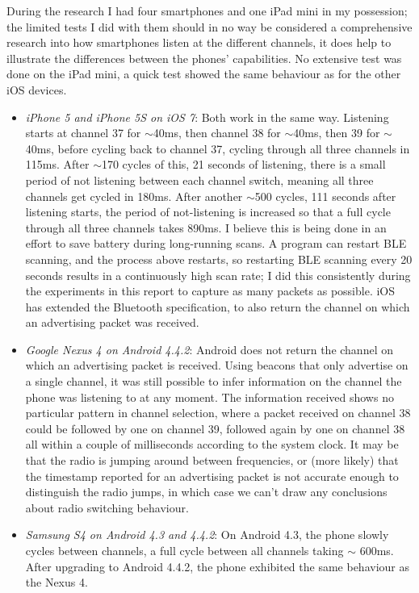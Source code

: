 During the research I had four smartphones and one iPad mini in my possession; the limited tests I did with them should in no way be considered a comprehensive research into how smartphones listen at the different channels, it does help to illustrate the differences between the phones' capabilities.
No extensive test was done on the iPad mini, a quick test showed the same behaviour as for the other iOS devices.
\begin{itemize}
    \item \emph{iPhone 5 and iPhone 5S on iOS 7}: Both work in the same way.
        Listening starts at channel 37 for $\sim$40ms, then channel 38 for $\sim$40ms, then 39 for $\sim$40ms, before cycling back to channel 37, cycling through all three channels in 115ms.
        After $\sim$170 cycles of this, 21 seconds of listening, there is a small period of not listening between each channel switch, meaning all three channels get cycled in 180ms.
        After another $\sim$500 cycles, 111 seconds after listening starts, the period of not-listening is increased so that a full cycle through all three channels takes 890ms.
        I believe this is being done in an effort to save battery during long-running scans.
        A program can restart BLE scanning, and the process above restarts, so restarting BLE scanning every 20 seconds results in a continuously high scan rate; I did this consistently during the experiments in this report to capture as many packets as possible.
        iOS has extended the Bluetooth specification, to also return the channel on which an advertising packet was received.
    \item \emph{Google Nexus 4 on Android 4.4.2}: Android does not return the channel on which an advertising packet is received. 
        Using beacons that only advertise on a single channel, it was still possible to infer information on the channel the phone was listening to at any moment.
        The information received shows no particular pattern in channel selection, where a packet received on channel 38 could be followed by one on channel 39, followed again by one on channel 38 all within a couple of milliseconds according to the system clock.
        It may be that the radio is jumping around between frequencies, or (more likely) that the timestamp reported for an advertising packet is not accurate enough to distinguish the radio jumps, in which case we can't draw any conclusions about radio switching behaviour.
    \item \emph{Samsung S4 on Android 4.3 and 4.4.2}: On Android 4.3, the phone slowly cycles between channels, a full cycle between all channels taking $\sim$ 600ms.
        After upgrading to Android 4.4.2, the phone exhibited the same behaviour as the Nexus 4.
\end{itemize}
        
